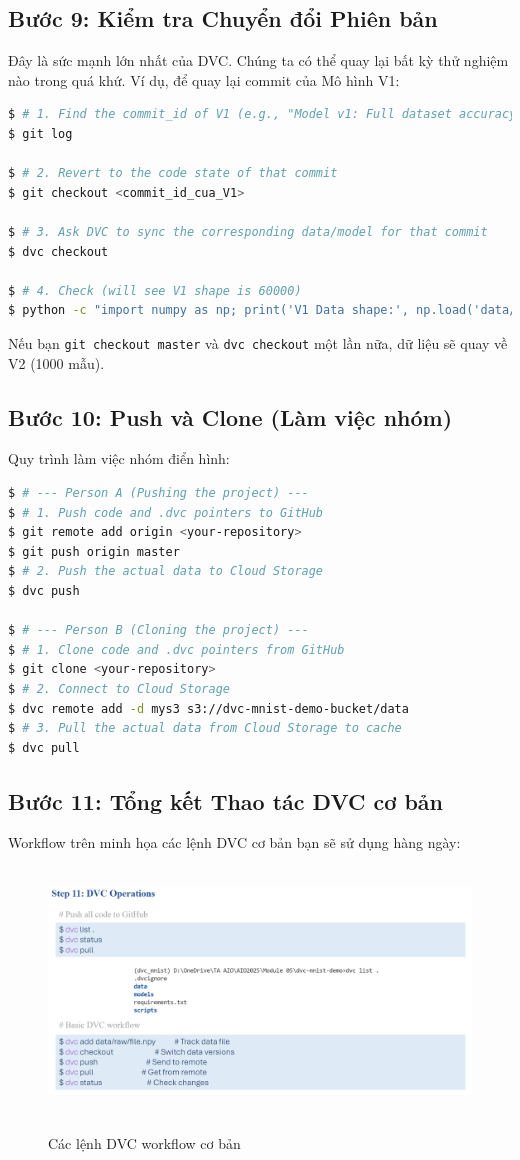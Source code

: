 \documentclass[11pt]{article}
\begin{document}
\subsection{Bước 9: Kiểm tra Chuyển đổi Phiên bản}
Đây là sức mạnh lớn nhất của DVC. Chúng ta có thể quay lại bất kỳ thử nghiệm nào trong quá khứ.
Ví dụ, để quay lại commit của Mô hình V1:
\begin{lstlisting}[language=bash]
$ # 1. Find the commit_id of V1 (e.g., "Model v1: Full dataset accuracy")
$ git log

$ # 2. Revert to the code state of that commit
$ git checkout <commit_id_cua_V1>

$ # 3. Ask DVC to sync the corresponding data/model for that commit
$ dvc checkout

$ # 4. Check (will see V1 shape is 60000)
$ python -c "import numpy as np; print('V1 Data shape:', np.load('data/raw/x_train.npy').shape)"
\end{lstlisting}
Nếu bạn \texttt{git checkout master} và \texttt{dvc checkout} một lần nữa, dữ liệu sẽ quay về V2 (1000 mẫu).

\subsection{Bước 10: Push và Clone (Làm việc nhóm)}
Quy trình làm việc nhóm điển hình:
\begin{lstlisting}[language=bash]
$ # --- Person A (Pushing the project) ---
$ # 1. Push code and .dvc pointers to GitHub
$ git remote add origin <your-repository>
$ git push origin master
$ # 2. Push the actual data to Cloud Storage
$ dvc push

$ # --- Person B (Cloning the project) ---
$ # 1. Clone code and .dvc pointers from GitHub
$ git clone <your-repository>
$ # 2. Connect to Cloud Storage
$ dvc remote add -d mys3 s3://dvc-mnist-demo-bucket/data
$ # 3. Pull the actual data from Cloud Storage to cache
$ dvc pull
\end{lstlisting}

\subsection{Bước 11: Tổng kết Thao tác DVC cơ bản}
Workflow trên minh họa các lệnh DVC cơ bản bạn sẽ sử dụng hàng ngày:

\begin{figure}[H]
    \centering
    \includegraphics[width=0.7\linewidth]{images/p22.png}
    \caption{Các lệnh DVC workflow cơ bản}
\end{figure}
\end{document}
